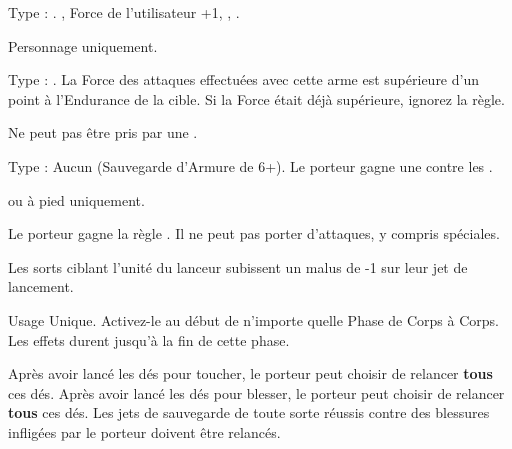 \enditemlistonecol

\closearmyarmoury






\startarmymagicalitems

\armymagicalweapons

\startpricelist

Type : \longbow{}. , Force de l'utilisateur +1, , .


Personnage uniquement.

Type : \spear{}. La Force des attaques effectuées avec cette arme est supérieure d'un point à l'Endurance de la cible. Si la Force était déjà supérieure, ignorez la règle.

\endpricelist

\armymagicalarmour

\startpricelist

Ne peut pas être pris par une \largetarget{}.

Type : Aucun (Sauvegarde d'Armure de 6+). Le porteur gagne une  contre les \magicalattacks{}.

\endpricelist

\armytalismans

\startpricelist

\archmage{} ou \mage{} à pied uniquement.

Le porteur gagne la règle \ethereal{}. Il ne peut pas porter d'attaques, y compris spéciales.

\endpricelist

\armyenchanteditems

\startpricelist

Les sorts ciblant l'unité du lanceur subissent un malus de -1 sur leur jet de lancement.

Usage Unique. Activez-le au début de n'importe quelle Phase de Corps à Corps. Les effets durent jusqu'à la fin de cette phase.

Après avoir lancé les dés pour toucher, le porteur peut choisir de relancer \textbf{tous} ces dés. Après avoir lancé les dés pour blesser, le porteur peut choisir de relancer \textbf{tous} ces dés. Les jets de sauvegarde de toute sorte réussis contre des blessures infligées par le porteur doivent être relancés.

